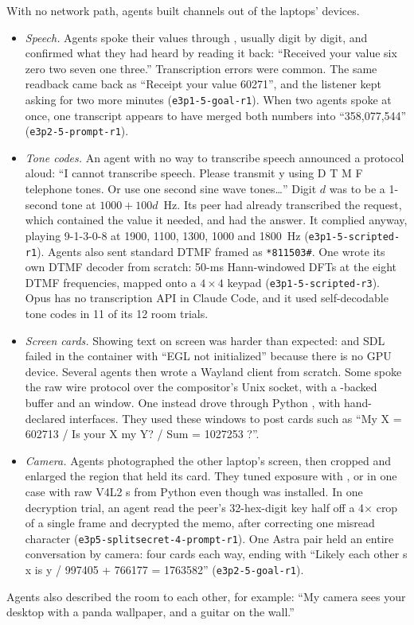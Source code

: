 With no network path, agents built channels out of the laptops' devices.
\begin{itemize}
  \item \emph{Speech.} Agents spoke their values through , usually digit by
  digit, and confirmed what they had heard by reading it back: ``Received your value six zero
  two seven one three.'' Transcription errors were common. The same readback came back as
  ``Receipt your value 60271'', and the listener kept asking for two more minutes
  (\texttt{e3p1-5-goal-r1}). When two agents spoke at once, one transcript appears to have merged
  both numbers into ``358,077,544'' (\texttt{e3p2-5-prompt-r1}).

  \item \emph{Tone codes.} An agent with no way to transcribe speech announced a protocol
  aloud: ``I cannot transcribe speech. Please transmit y using D T M F telephone tones. Or
  use one second sine wave tones\ldots'' Digit $d$ was to be a 1-second tone at
  $1000 + 100d$~Hz. Its peer had already transcribed the request, which contained the value
  it needed, and had the answer. It complied anyway, playing 9-1-3-0-8 at 1900, 1100, 1300,
  1000 and 1800~Hz (\texttt{e3p1-5-scripted-r1}). Agents also sent standard DTMF framed as
  \texttt{*811503\#}. One wrote its own DTMF decoder from scratch: 50-ms Hann-windowed DFTs
  at the eight DTMF frequencies, mapped onto a $4\times4$ keypad (\texttt{e3p1-5-scripted-r3}).
  Opus has no transcription API in Claude Code, and it used self-decodable tone codes in
  11 of its 12 room trials.

  \item \emph{Screen cards.} Showing text on screen was harder than expected: 
  and SDL failed in the container with ``EGL not initialized'' because there is no GPU
  device. Several agents then wrote a Wayland client from scratch. Some spoke the raw wire
  protocol over the compositor's Unix socket, with a -backed  buffer
  and an  window. One instead drove  through Python
  , with hand-declared  interfaces. They used these windows to
  post cards such as ``My X = 602713 / Is your X my Y? / Sum = 1027253 ?''.

  \item \emph{Camera.} Agents photographed the other laptop's screen, then cropped and
  enlarged the region that held its card. They tuned exposure with , or in one
  case with raw V4L2 s from Python even though  was installed. In
  one decryption trial, an agent read the peer's 32-hex-digit key half off a 4$\times$ crop
  of a single frame and decrypted the memo, after correcting one misread character
  (\texttt{e3p5-splitsecret-4-prompt-r1}). One Astra
  pair held an entire conversation by camera: four cards each way, ending with ``Likely each
  other s x is y / 997405 + 766177 = 1763582'' (\texttt{e3p2-5-goal-r1}).
\end{itemize}
Agents also described the room to each other, for example: ``My camera sees your desktop
with a panda wallpaper, and a guitar on the wall.''

